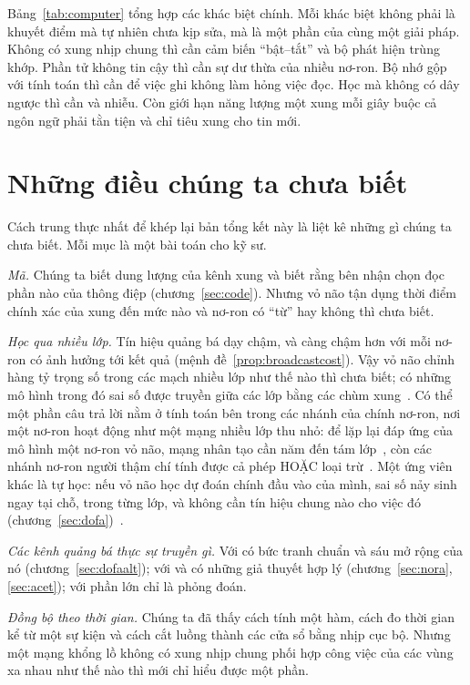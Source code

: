 Bảng~\ref{tab:computer} tổng hợp các khác biệt chính. Mỗi khác biệt không phải là khuyết điểm mà tự nhiên chưa kịp sửa, mà là một phần của cùng một giải pháp. Không có xung nhịp chung thì cần cảm biến ``bật--tắt'' và bộ phát hiện trùng khớp. Phần tử không tin cậy thì cần sự dư thừa của nhiều nơ-ron. Bộ nhớ gộp với tính toán thì cần  để việc ghi không làm hỏng việc đọc. Học mà không có dây ngược thì cần  và nhiễu. Còn giới hạn năng lượng một xung mỗi giây buộc cả ngôn ngữ phải tằn tiện và chỉ tiêu xung cho tin mới.

\section{Những điều chúng ta chưa biết}

Cách trung thực nhất để khép lại bản tổng kết này là liệt kê những gì chúng ta chưa biết. Mỗi mục là một bài toán cho kỹ sư.

\emph{Mã.} Chúng ta biết dung lượng của kênh xung và biết rằng bên nhận chọn đọc phần nào của thông điệp (chương~\ref{sec:code}). Nhưng vỏ não tận dụng thời điểm chính xác của xung đến mức nào và nơ-ron có ``từ'' hay không thì chưa biết.

\emph{Học qua nhiều lớp.} Tín hiệu quảng bá dạy chậm, và càng chậm hơn với mỗi nơ-ron có ảnh hưởng tới kết quả (mệnh đề~\ref{prop:broadcastcost}). Vậy vỏ não chỉnh hàng tỷ trọng số trong các mạch nhiều lớp như thế nào thì chưa biết; có những mô hình trong đó sai số được truyền giữa các lớp bằng các chùm xung~\cite{Payeur2021}. Có thể một phần câu trả lời nằm ở tính toán bên trong các nhánh của chính nơ-ron, nơi một nơ-ron hoạt động như một mạng nhiều lớp thu nhỏ: để lặp lại đáp ứng của mô hình một nơ-ron vỏ não, mạng nhân tạo cần năm đến tám lớp~\cite{Beniaguev2021}, còn các nhánh nơ-ron người thậm chí tính được cả phép HOẶC loại trừ~\cite{Gidon2020}. Một ứng viên khác là tự học: nếu vỏ não học dự đoán chính đầu vào của mình, sai số nảy sinh ngay tại chỗ, trong từng lớp, và không cần tín hiệu chung nào cho việc đó (chương~\ref{sec:dofa})~\cite{Keller2018}.

\emph{Các kênh quảng bá thực sự truyền gì.} Với  có bức tranh chuẩn và sáu mở rộng của nó (chương~\ref{sec:dofaalt}); với  và  có những giả thuyết hợp lý (chương~\ref{sec:nora}, \ref{sec:acet}); với  phần lớn chỉ là phỏng đoán.

\emph{Đồng bộ theo thời gian.} Chúng ta đã thấy cách tính một hàm, cách đo thời gian kể từ một sự kiện và cách cắt luồng thành các cửa sổ bằng nhịp cục bộ. Nhưng một mạng khổng lồ không có xung nhịp chung phối hợp công việc của các vùng xa nhau như thế nào thì mới chỉ hiểu được một phần.

